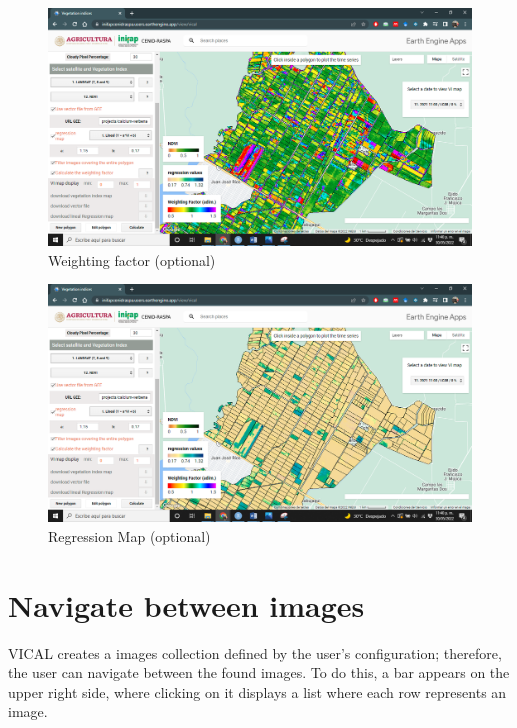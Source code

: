 \documentclass[
]{book}
\begin{document}
\begin{figure}

{\centering \includegraphics[width=0.85\linewidth]{./images/Figure53} 

}

\caption{Weighting factor (optional)}\label{fig:figI3}
\end{figure}

\begin{figure}

{\centering \includegraphics[width=0.85\linewidth]{./images/Figure54} 

}

\caption{Regression Map (optional)}\label{fig:figI4}
\end{figure}

\hypertarget{navigate-between-images}{%
\section{Navigate between images}\label{navigate-between-images}}

VICAL creates a images collection defined by the user's configuration; therefore, the user can navigate between the found images. To do this, a bar appears on the upper right side, where clicking on it displays a list where each row represents an image.
\end{document}
